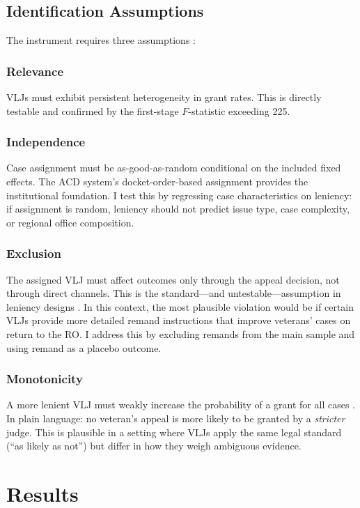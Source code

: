 \documentclass[12pt]{article}
\begin{document}
\subsection{Identification Assumptions}

The instrument requires three assumptions \citep{angrist1996,frandsen2023}:

\subsubsection*{Relevance} VLJs must exhibit persistent heterogeneity in grant rates. This is directly testable and confirmed by the first-stage $F$-statistic exceeding 225.

\subsubsection*{Independence} Case assignment must be as-good-as-random conditional on the included fixed effects. The ACD system's docket-order-based assignment provides the institutional foundation. I test this by regressing case characteristics on leniency: if assignment is random, leniency should not predict issue type, case complexity, or regional office composition.

\subsubsection*{Exclusion} The assigned VLJ must affect outcomes only through the appeal decision, not through direct channels. This is the standard---and untestable---assumption in leniency designs \citep{chyn2024}. In this context, the most plausible violation would be if certain VLJs provide more detailed remand instructions that improve veterans' cases on return to the RO. I address this by excluding remands from the main sample and using remand as a placebo outcome.

\subsubsection*{Monotonicity} A more lenient VLJ must weakly increase the probability of a grant for all cases \citep{frandsen2023,dechaisemartin2017}. In plain language: no veteran's appeal is more likely to be granted by a \textit{stricter} judge. This is plausible in a setting where VLJs apply the same legal standard (``as likely as not'') but differ in how they weigh ambiguous evidence.


\section{Results}
\end{document}
